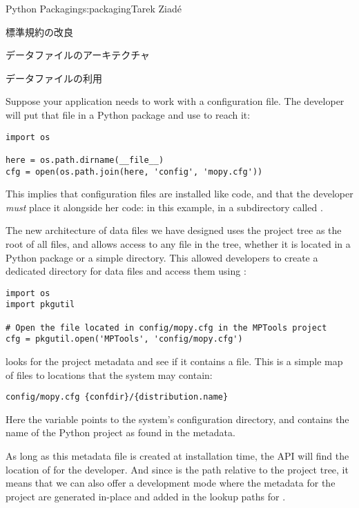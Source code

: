 \begin{aosachapter}{Python Packaging}{s:packaging}{Tarek Ziad\'{e}}
\begin{aosasect1}{標準規約の改良}
\begin{aosasect2}{データファイルのアーキテクチャ}
\begin{aosasect3}{データファイルの利用}

Suppose your  application needs to work with a
configuration file.  The developer will put that file in a Python
package and use  to reach it:

\begin{verbatim}
import os

here = os.path.dirname(__file__)
cfg = open(os.path.join(here, 'config', 'mopy.cfg'))
\end{verbatim}

\noindent This implies that configuration files are installed like code, and
that the developer \emph{must} place it alongside her code: in this
example, in a subdirectory called .

The new architecture of data files we have designed
uses the project tree as the root
of all files, and allows access to any file in the tree, whether it is
located in a Python package or a simple directory.  This allowed
developers to create a dedicated directory for data files and access
them using :

\begin{verbatim}
import os
import pkgutil

# Open the file located in config/mopy.cfg in the MPTools project
cfg = pkgutil.open('MPTools', 'config/mopy.cfg')
\end{verbatim}

\noindent {} looks for the project metadata and see if it
contains a  file. This is a simple map of files to
locations that the system may contain:

\begin{verbatim}
config/mopy.cfg {confdir}/{distribution.name}
\end{verbatim}

\noindent Here the  variable points to the
system's configuration directory, and 
contains the name of the Python project as found in the metadata.


As long as this  metadata file is created at
installation time, the API will find the location of 
for the developer.  And since  is the path
relative to the project tree, it means that we can also offer a
development mode where the metadata for the project are generated
in-place and added in the lookup paths for .


\end{aosasect3}
\end{aosasect2}
\end{aosasect1}
\end{aosachapter}
